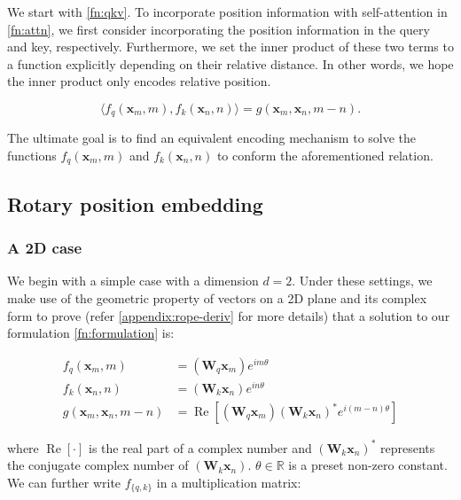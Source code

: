 \if We start with \ref{fn:qkv}. To incorporate position information with self-attention in \ref{fn:attn}, we first consider incorporating the position information in the query and key, respectively.  Furthermore, we set the inner product of these two terms to a function explicitly depending on their relative distance. In other words, we hope the inner product only encodes relative position. \fi

\begin{equation}
	\langle f_q({\boldsymbol x}_m, m),f_k({\boldsymbol x}_n, n)\rangle=g({\boldsymbol x}_m,{\boldsymbol x}_n,m-n).
	\label{fn:formulation}
\end{equation}

The ultimate goal is to find an equivalent encoding mechanism to solve the functions $f_q({\boldsymbol x}_m, m)$ and $f_k({\boldsymbol x}_n, n)$ to conform the aforementioned relation. 

\subsection{Rotary position embedding}
\label{sec:RoPE}

\subsubsection{A 2D case} We begin with a simple case with a dimension $d=2$. Under these settings, we make use of the geometric property of vectors on a 2D plane and its complex form to prove (refer \ref{appendix:rope-deriv} for more details) that a solution to our formulation \ref{fn:formulation} is:

\begin{equation}
	\begin{aligned}
		f_q({\boldsymbol x}_m, m) &= ({\boldsymbol W}_q{\boldsymbol x}_m)e^{im\theta}\\
		f_k({\boldsymbol x}_n, n) &= ({\boldsymbol W}_k{\boldsymbol x}_n)e^{in\theta}\\

		g({\boldsymbol x}_m, {\boldsymbol x}_n, m - n) &= \operatorname{Re}[({\boldsymbol W}_q{\boldsymbol x}_m)({\boldsymbol W}_k{\boldsymbol x}_n)^{*}e^{i(m - n)\theta}]
	\end{aligned}
	\label{fn:res-2d}
\end{equation}

where $\operatorname{Re}[\cdot]$ is the real part of a complex number and $({\boldsymbol W}_k{\boldsymbol x}_n)^{*}$ represents the conjugate complex number of $({\boldsymbol W}_k{\boldsymbol x}_n)$. $\theta \in \mathbb{R}$ is a preset non-zero constant. We can further write $f_{\{q, k\}}$ in a multiplication matrix:

